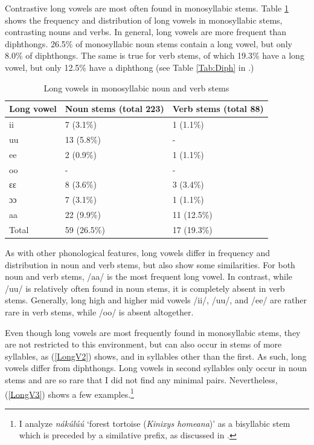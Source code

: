 Contrastive long vowels are most often found in monosyllabic stems. Table \ref{Tab:VLength} shows the frequency and distribution of long vowels in monosyllabic stems, contrasting nouns and verbs. In general, long vowels are more frequent than diphthongs. 26.5\% of monosyllabic noun stems contain a long vowel, but only 8.0\% of diphthongs. The same is true for verb stems, of which 19.3\% have a long vowel, but only 12.5\% have a diphthong (see Table \ref{Tab:Diph} in .)

\begin{table} 
\centering
\begin{tabular}{l|ll}
Long vowel & 	Noun stems (total 223) & Verb stems (total 88) \\  \midrule
ii		 & 	7 (3.1\%)	& 	1 (1.1\%)  \\
uu		& 	13 (5.8\%)	& 	-  \\
ee		& 	2   (0.9\%)    & 	1 (1.1\%)  \\
oo	        & 	 -	& 	-  \\ 
ɛɛ            &       8  (3.6\%)    &     3  (3.4\%) \\
ɔɔ            &        7   (3.1\%)  &      1 (1.1\%)  \\
aa            &        22  (9.9\%)    &    11   (12.5\%)   \\  \midrule
Total       &        59   (26.5\%)   &     17 (19.3\%)  \\
\end{tabular}
\caption{Long vowels in monosyllabic noun and verb stems}
\label{Tab:VLength}
\end{table}

As with other phonological features, long vowels differ in frequency and distribution in noun and verb stems, but also show some similarities. For both noun and verb stems, /aa/ is the most frequent long vowel. In contrast, while /uu/ is relatively often found in noun stems, it is completely absent in verb stems. Generally, long high and higher mid vowels /ii/, /uu/, and /ee/ are rather rare in verb stems, while /oo/  is absent altogether.

Even though long vowels are most frequently found in monosyllabic stems, they are not restricted to this environment, but can also occur in stems of more syllables, as (\ref{LongV2}) shows, and in syllables other than the first. As such, long vowels differ from diphthongs. Long vowels in second syllables only occur in noun stems and are so rare that I did not find any minimal pairs. Nevertheless, (\ref{LongV3}) shows a few examples.\footnote{I analyze {\itshape nákúlúú} `forest tortoise ({\itshape Kinixys homeana})' as a bisyllabic stem which is preceded by a similative prefix, as discussed in .}

